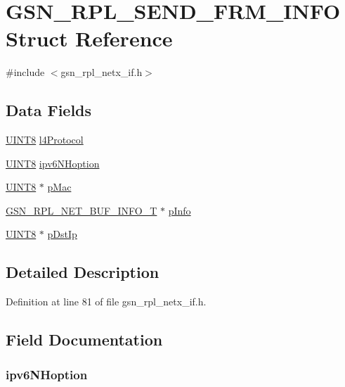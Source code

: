 \hypertarget{a00211}{
\section{GSN\_\-RPL\_\-SEND\_\-FRM\_\-INFO Struct Reference}
\label{a00211}
}


{\ttfamily \#include $<$gsn\_\-rpl\_\-netx\_\-if.h$>$}

\subsection*{Data Fields}
\begin{DoxyCompactItemize}
\item 
\hyperlink{a00660_gab27e9918b538ce9d8ca692479b375b6a}{UINT8} \hyperlink{a00211_a443980e432355afdf3da81556fc820d7}{l4Protocol}
\item 
\hyperlink{a00660_gab27e9918b538ce9d8ca692479b375b6a}{UINT8} \hyperlink{a00211_affc618ec6fc1ec6decf3da37f66f123f}{ipv6NHoption}
\item 
\hyperlink{a00660_gab27e9918b538ce9d8ca692479b375b6a}{UINT8} $\ast$ \hyperlink{a00211_aadb0c05fc645250e90101a10dfa4b7b8}{pMac}
\item 
\hyperlink{a00207}{GSN\_\-RPL\_\-NET\_\-BUF\_\-INFO\_\-T} $\ast$ \hyperlink{a00211_a24c66f5468b12f00f3e7857a6845fcb8}{pInfo}
\item 
\hyperlink{a00660_gab27e9918b538ce9d8ca692479b375b6a}{UINT8} $\ast$ \hyperlink{a00211_aaf13a81e05b57b57dd506f8dbf18026c}{pDstIp}
\end{DoxyCompactItemize}


\subsection{Detailed Description}


Definition at line 81 of file gsn\_\-rpl\_\-netx\_\-if.h.



\subsection{Field Documentation}
\hypertarget{a00211_affc618ec6fc1ec6decf3da37f66f123f}{
\subsubsection[{ipv6NHoption}]{ {\bf ipv6NHoption}}}
\label{a00211_affc618ec6fc1ec6decf3da37f66f123f}


